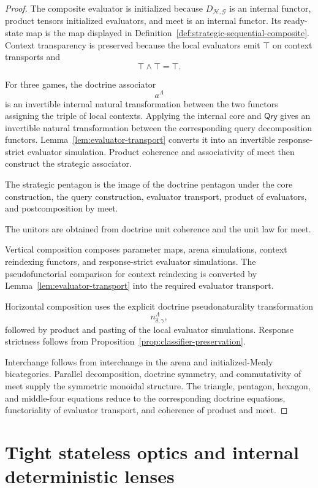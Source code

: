 \begin{proof}
The composite evaluator is initialized because \(D_{\mathcal H,\mathcal G}\) is an internal functor,
product tensors initialized evaluators, and meet is an internal functor. Its ready-state map is the
map displayed in Definition~\ref{def:strategic-sequential-composite}. Context transparency is
preserved because the local evaluators emit \(\top\) on context transports and
\[
  \top\wedge\top=\top.
\]

For three games, the doctrine associator
\[
  a^\Lambda
\]
is an invertible internal natural transformation between the two functors assigning the triple of
local contexts. Applying the internal core and \(\mathsf{Qry}\) gives an invertible natural
transformation between the corresponding query decomposition functors.
Lemma~\ref{lem:evaluator-transport} converts it into an invertible response-strict evaluator
simulation. Product coherence and associativity of meet then construct the strategic associator.

The strategic pentagon is the image of the doctrine pentagon under the core construction, the query
construction, evaluator transport, product of evaluators, and postcomposition by meet.

The unitors are obtained from doctrine unit coherence and the unit law for meet.

Vertical composition composes parameter maps, arena simulations, context reindexing functors, and
response-strict evaluator simulations. The pseudofunctorial comparison for context reindexing is
converted by Lemma~\ref{lem:evaluator-transport} into the required evaluator transport.

Horizontal composition uses the explicit doctrine pseudonaturality transformation
\[
  n^\Lambda_{\delta,\gamma},
\]
followed by product and pasting of the local evaluator simulations. Response strictness follows from
Proposition~\ref{prop:classifier-preservation}.

Interchange follows from interchange in the arena and initialized-Mealy bicategories. Parallel
decomposition, doctrine symmetry, and commutativity of meet supply the symmetric monoidal structure.
The triangle, pentagon, hexagon, and middle-four equations reduce to the corresponding doctrine
equations, functoriality of evaluator transport, and coherence of product and meet.
\end{proof}

\section{Tight stateless optics and internal deterministic lenses}
\label{sec:tight-stateless-optics}

